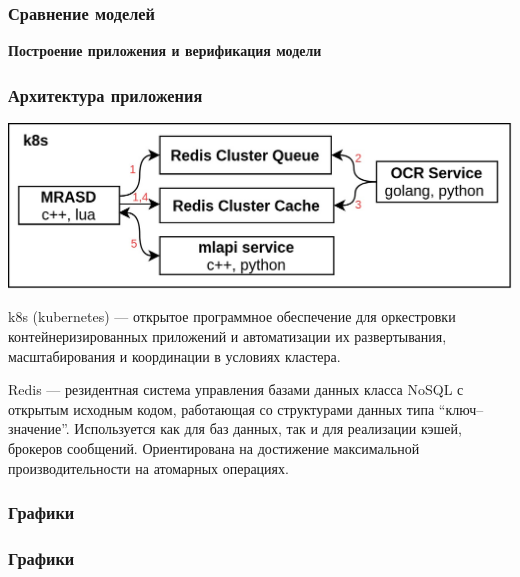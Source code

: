 \documentclass[compress,professionalfont]{beamer}
\begin{document}
\begin{frame}
\frametitle{Сравнение моделей}

\end{frame}

\begin{frame}

\begin{center}
\Huge\bf Построение приложения и верификация модели
\end{center}

\end{frame}

\begin{frame}
\frametitle{Архитектура приложения}

\begin{center}
\includegraphics[width=.8\textwidth]{architecture.jpg}
\end{center}

k8s (kubernetes) --- открытое программное обеспечение для оркестровки контейнеризированных приложений и автоматизации их развертывания, масштабирования и координации в условиях кластера.

Redis --- резидентная система управления базами данных класса NoSQL с открытым исходным кодом, работающая со структурами данных типа ``ключ--значение''. Используется как для баз данных, так и для реализации кэшей, брокеров сообщений. Ориентирована на достижение максимальной производительности на атомарных операциях.

\end{frame}

\begin{frame}
\frametitle{Графики}

\end{frame}

\begin{frame}
\frametitle{Графики}

\end{frame}
\end{document}
